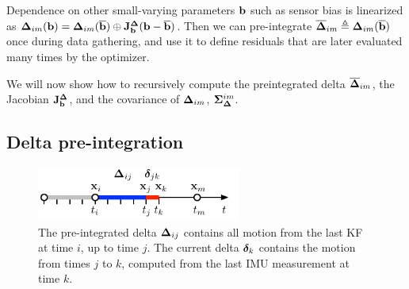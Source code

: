 Dependence on other small-varying parameters ${\bf b}$ such as sensor bias is linearized as ${\bm \Delta}_{im}({\bf b})={\bm \Delta}_{im}(\overline{{\bf b}}) \oplus {\bf J}^{\bm \Delta}_{\bf b}({\bf b}-\overline{{\bf b}})$.
Then we can pre-integrate $\overline{{\bm \Delta}}_{im}\triangleq{\bm \Delta}_{im}(\overline{{\bf b}})$ once during data gathering, and use it to define residuals that are later evaluated many times by the optimizer. 

We will now show how to recursively compute the preintegrated delta $\overline{{\bm \Delta}}_{im}$, the Jacobian ${\bf J}^{\bm \Delta}_{\bf b}$, and the covariance of ${\bm \Delta}_{im}$, ${\bm \Sigma}_{{\bm \Delta}}^{im}$.




\subsection{Delta pre-integration}

\begin{figure}[tb]
    \centering
    \includegraphics[width=0.6\textwidth]{figures/delta_time}
    \caption{The pre-integrated delta ${\bm \Delta}_{ij}$ contains all motion from the last KF at time $i$, up to time $j$. 
    The current delta ${\bm \delta}_k$ contains the motion from times $j$ to $k$, computed from the last IMU measurement at time $k$.}
    \label{fig:delta_time}
\end{figure}

